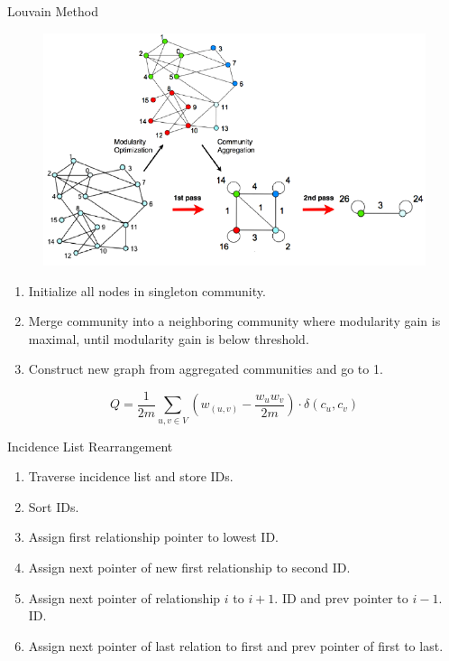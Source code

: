 \documentclass[rgb]{beamer}
\begin{document}
        \begin{frame}[allowframebreaks]{Louvain Method}
            \begin{figure}
                \begin{center}
                \includegraphics[keepaspectratio, height=0.8\textheight, width=.8\textwidth]{img/louvain.png}
                \end{center}
            \end{figure}
            
            \framebreak
            
            \begin{enumerate}
             \item Initialize all nodes in singleton community.
             \item Merge community into a neighboring community where modularity gain is maximal, until modularity gain is below threshold.
             \item Construct new graph from aggregated communities and go to 1.
            \end{enumerate}
            \vspace{2em}
            \[ Q = \frac{1}{2m} \sum_{u,v \in V} \left( w_{(u, v)} - \frac{w_u w_v}{2m} \right) \cdot \delta (c_u, c_v) \]
            
        \end{frame}
    
        \begin{frame}{Incidence List Rearrangement}
            \begin{enumerate}
             \item Traverse incidence list and store IDs.
             \item Sort IDs.
             \item Assign first relationship pointer to lowest ID.
             \item Assign next pointer of new first relationship to second ID.
             \item Assign next pointer of relationship $i$ to $i+1$. ID and prev pointer to $i-1$. ID.
             \item Assign next pointer of last relation to first and prev pointer of first to last.
            \end{enumerate}

        \end{frame}
        
\end{document}
